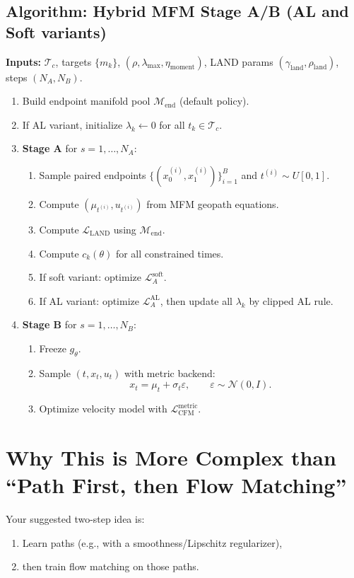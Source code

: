 \documentclass[11pt]{article}
\begin{document}
\subsection*{Algorithm: Hybrid MFM Stage A/B (AL and Soft variants)}
\textbf{Inputs:} $\mathcal{T}_c$, targets $\{m_k\}$, $(\rho,\lambda_{\max},\eta_{\mathrm{moment}})$,
LAND params $(\gamma_{\mathrm{land}},\rho_{\mathrm{land}})$, steps $(N_A,N_B)$.
\begin{enumerate}
    \item Build endpoint manifold pool $\mathcal{M}_{\mathrm{end}}$ (default policy).
    \item If AL variant, initialize $\lambda_k\gets 0$ for all $t_k\in\mathcal{T}_c$.
    \item \textbf{Stage A} for $s=1,\dots,N_A$:
    \begin{enumerate}
        \item Sample paired endpoints $\{(x_0^{(i)},x_1^{(i)})\}_{i=1}^B$ and $t^{(i)}\sim U[0,1]$.
        \item Compute $(\mu_{t^{(i)}},u_{t^{(i)}})$ from MFM geopath equations.
        \item Compute $\mathcal{L}_{\mathrm{LAND}}$ using $\mathcal{M}_{\mathrm{end}}$.
        \item Compute $c_k(\theta)$ for all constrained times.
        \item If soft variant: optimize $\mathcal{L}_A^{\mathrm{soft}}$.
        \item If AL variant: optimize $\mathcal{L}_A^{\mathrm{AL}}$, then update all $\lambda_k$ by clipped AL rule.
    \end{enumerate}
    \item \textbf{Stage B} for $s=1,\dots,N_B$:
    \begin{enumerate}
        \item Freeze $g_\theta$.
        \item Sample $(t,x_t,u_t)$ with metric backend:
        \[
        x_t=\mu_t+\sigma_t\varepsilon,\qquad \varepsilon\sim\mathcal{N}(0,I).
        \]
        \item Optimize velocity model with $\mathcal{L}_{\mathrm{CFM}}^{\mathrm{metric}}$.
    \end{enumerate}
\end{enumerate}

\section{Why This is More Complex than ``Path First, then Flow Matching''}
Your suggested two-step idea is:
\begin{enumerate}
    \item Learn paths (e.g., with a smoothness/Lipschitz regularizer),
    \item then train flow matching on those paths.
\end{enumerate}
\end{document}
